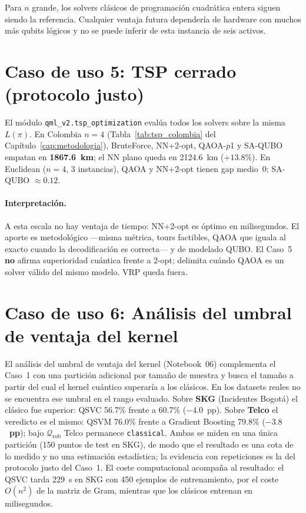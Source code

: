 Para $n$ grande, los solvers clásicos de programación cuadrática entera siguen siendo la referencia. Cualquier ventaja futura dependería de hardware con muchos más qubits lógicos y no se puede inferir de esta instancia de seis activos.

\section{Caso de uso 5: TSP cerrado (protocolo justo)}
\label{sec:eval_tsp}

El módulo \texttt{qml\_v2.tsp\_optimization} evalúa todos los solvers sobre la misma $L(\pi)$. En Colombia $n=4$ (Tabla~\ref{tab:tsp_colombia} del Capítulo~\ref{cap:metodologia}), BruteForce, NN+2-opt, QAOA-$p$1 y SA-QUBO empatan en \textbf{1867.6~km}; el NN plano queda en 2124.6~km ($+13.8\%$). En Euclidean ($n=4$, 3 instancias), QAOA y NN+2-opt tienen gap medio~$0$; SA-QUBO $\approx 0.12$.

\paragraph{Interpretación.}
A esta escala no hay ventaja de tiempo: NN+2-opt es óptimo en milisegundos. El aporte es metodológico ---misma métrica, tours factibles, QAOA que iguala al exacto cuando la decodificación es correcta--- y de modelado QUBO. El Caso~5 \textbf{no} afirma superioridad cuántica frente a 2-opt; delimita cuándo QAOA es un solver válido del mismo modelo. VRP queda fuera.

\section{Caso de uso 6: Análisis del umbral de ventaja del kernel}

El análisis del umbral de ventaja del kernel (Notebook~06) complementa el Caso~1 con una partición adicional por tamaño de muestra y busca el tamaño a partir del cual el kernel cuántico superaría a los clásicos. En los datasets reales no se encuentra ese umbral en el rango evaluado. Sobre \textbf{SKG} (Incidentes Bogotá) el clásico fue superior: QSVC 56.7\% frente a 60.7\% ($-4.0$~pp). Sobre \textbf{Telco} el veredicto es el mismo: QSVM 76.0\% frente a Gradient Boosting 79.8\% (\textbf{$-3.8$~pp}); bajo $\mathcal{Q}_{\mathrm{rob}}$ Telco permanece \texttt{classical}. Ambas se miden en una única partición (150 puntos de test en SKG), de modo que el resultado es una cota de lo medido y no una estimación estadística; la evidencia con repeticiones es la del protocolo justo del Caso~1. El coste computacional acompaña al resultado: el QSVC tarda 229~s en SKG con 450 ejemplos de entrenamiento, por el coste $O(n^2)$ de la matriz de Gram, mientras que los clásicos entrenan en milisegundos.

